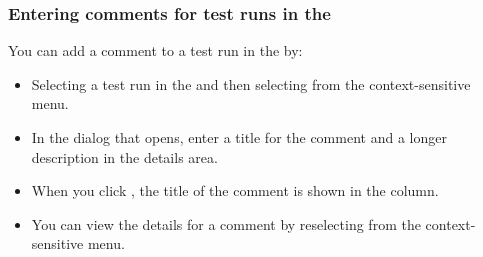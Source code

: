 
\subsubsection{Entering comments for test runs in the \gdtestsummaryview}
\label{TestSummaryComments}
You can add a comment to a test run in the \gdtestsummaryview{} by:
\begin{itemize}
\item  Selecting a test run in the \gdtestsummaryview{} and then selecting  from the context-sensitive menu.
\item In the dialog that opens, enter a title for the comment and a longer description in the details area. 
\item When you click , the title of the comment is shown in the  column. 
\item You can view the  details for a comment by reselecting  from the context-sensitive menu.
\end{itemize}
